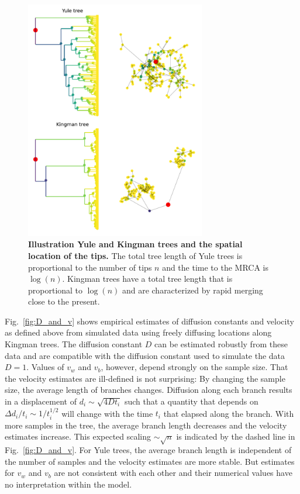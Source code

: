 \documentclass[aps,rmp, twocolumn]{revtex4}
\begin{document}
\begin{figure}[tb]
    \includegraphics*[width=0.7\textwidth]{figures/illustration_tree.pdf}
    \caption{\label{fig:illustration_tree}{\bf Illustration Yule and Kingman trees and the spatial location of the tips.}
    The total tree length of Yule trees is proportional to the number of tips $n$ and the time to the MRCA is $\log(n)$.
    Kingman trees have a total tree length that is proportional to $\log(n)$ and are characterized by rapid merging close to the present. }
\end{figure}


Fig.~\ref{fig:D_and_v} shows empirical estimates of diffusion constants and velocity as defined above from simulated data using freely diffusing locations along Kingman trees.
The diffusion constant $D$ can be estimated robustly from these data and are compatible with the diffusion constant used to simulate the data $D=1$.
Values of $v_w$ and $v_b$, however, depend strongly on the sample size. 
That the velocity estimates are ill-defined is not surprising: By changing the sample size, the average length of branches changes. Diffusion along each branch results in a displacement of $d_i \sim \sqrt{4Dt_i}$ such that a quantity that depends on $\Delta d_i / t_i \sim 1/t_i^{1/2}$ will change with the time $t_i$ that elapsed along the branch.
With more samples in the tree, the average branch length decreases and the velocity estimates increase. 
This expected scaling $\sim \sqrt{n}$ is indicated by the dashed line in Fig.~\ref{fig:D_and_v}.
For Yule trees, the average branch length is independent of the number of samples and the velocity estimates are more stable. 
But estimates for $v_w$ and $v_b$ are not consistent with each other and their numerical values have no interpretation within the model.
\end{document}
